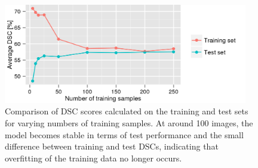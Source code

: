 \begin{figure}[tb]
\centering
\includegraphics[width=0.95\textwidth]{figures/train_count}

\caption{Comparison of DSC scores calculated on the training and test sets for
varying numbers of training samples. At around 100 images, the model becomes
stable in terms of test performance and the small difference between training
and test DSCs, indicating that overfitting of the training data no longer
occurs.}
\label{fig:bioms}
\end{figure}




